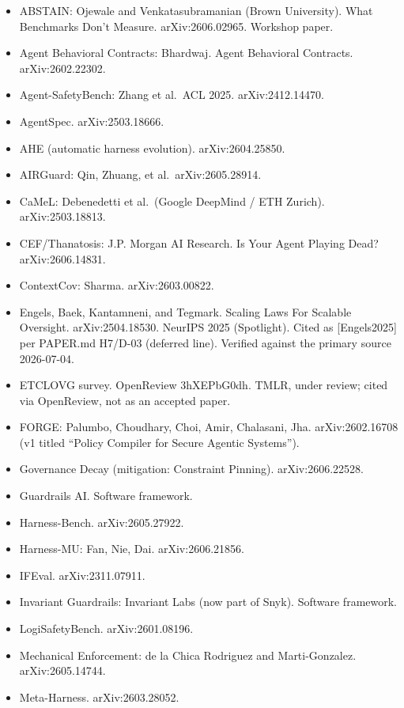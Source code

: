 \documentclass[
]{article}
\providecommand{\tightlist}{%
  \setlength{\itemsep}{0pt}\setlength{\parskip}{0pt}}
\begin{document}
\begin{itemize}
\tightlist
\item
  ABSTAIN: Ojewale and Venkatasubramanian (Brown University). What
  Benchmarks Don't Measure. arXiv:2606.02965. Workshop paper.
\item
  Agent Behavioral Contracts: Bhardwaj. Agent Behavioral Contracts.
  arXiv:2602.22302.
\item
  Agent-SafetyBench: Zhang et al.~ACL 2025. arXiv:2412.14470.
\item
  AgentSpec. arXiv:2503.18666.
\item
  AHE (automatic harness evolution). arXiv:2604.25850.
\item
  AIRGuard: Qin, Zhuang, et al.~arXiv:2605.28914.
\item
  CaMeL: Debenedetti et al.~(Google DeepMind / ETH Zurich).
  arXiv:2503.18813.
\item
  CEF/Thanatosis: J.P. Morgan AI Research. Is Your Agent Playing Dead?
  arXiv:2606.14831.
\item
  ContextCov: Sharma. arXiv:2603.00822.
\item
  Engels, Baek, Kantamneni, and Tegmark. Scaling Laws For Scalable
  Oversight. arXiv:2504.18530. NeurIPS 2025 (Spotlight). Cited as
  {[}Engels2025{]} per PAPER.md H7/D-03 (deferred line). Verified
  against the primary source 2026-07-04.
\item
  ETCLOVG survey. OpenReview 3hXEPbG0dh. TMLR, under review; cited via
  OpenReview, not as an accepted paper.
\item
  FORGE: Palumbo, Choudhary, Choi, Amir, Chalasani, Jha.
  arXiv:2602.16708 (v1 titled ``Policy Compiler for Secure Agentic
  Systems'').
\item
  Governance Decay (mitigation: Constraint Pinning). arXiv:2606.22528.
\item
  Guardrails AI. Software framework.
\item
  Harness-Bench. arXiv:2605.27922.
\item
  Harness-MU: Fan, Nie, Dai. arXiv:2606.21856.
\item
  IFEval. arXiv:2311.07911.
\item
  Invariant Guardrails: Invariant Labs (now part of Snyk). Software
  framework.
\item
  LogiSafetyBench. arXiv:2601.08196.
\item
  Mechanical Enforcement: de la Chica Rodriguez and Marti-Gonzalez.
  arXiv:2605.14744.
\item
  Meta-Harness. arXiv:2603.28052.

\end{itemize}
\end{document}
